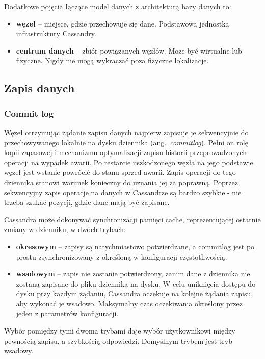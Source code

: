 Dodatkowe pojęcia łączące model danych z architekturą bazy danych to:
\begin{itemize}
    \item \textbf{węzeł} -- miejsce, gdzie przechowuje się dane.
    Podstawowa jednostka infrastruktury Cassandry.
    \item \textbf{centrum danych} -- zbiór powiązanych węzłów. 
    Może być wirtualne lub fizyczne.
    Nigdy nie mogą wykraczać poza fizyczne lokalizacje.
\end{itemize}

\subsection{Zapis danych}

\subsubsection{Commit log}

Węzeł otrzymując żądanie zapisu danych najpierw zapisuje je sekwencyjnie do przechowywanego lokalnie na dysku dziennika (ang.~\textit{commitlog}).
Pełni on rolę kopii zapasowej i mechanizmu optymalizacji zapisu historii przeprowadzonych operacji na wypadek awarii.
Po restarcie uszkodzonego węzła na jego podstawie węzeł jest wstanie powrócić do stanu sprzed awarii.
Zapis operacji do tego dziennika stanowi warunek konieczny do uznania jej za poprawną.
Poprzez sekwencyjny zapis operacje na danych w Cassandrze są bardzo szybkie - nie trzeba szukać pozycji, gdzie dane mają być zapisane.

Cassandra może dokonywać synchronizacji pamięci cache, reprezentującej ostatnie zmiany w dzienniku, w dwóch trybach:
\begin{itemize}
    \item \textbf{okresowym} -- zapisy są natychmiastowo potwierdzane, a commitlog jest po prostu zsynchronizowany z określoną w konfiguracji częstotliwością.
    \item \textbf{wsadowym} -- zapis nie zostanie potwierdzony, zanim dane z dziennika nie zostaną zapisane do pliku dziennika na dysku. 
    W celu uniknięcia dostępu do dysku przy każdym żądaniu, Cassandra oczekuje na kolejne żądania zapisu, aby wykonać je wsadowo. 
    Maksymalny czas oczekiwania określony przez jeden z parametrów konfiguracji.
\end{itemize}
Wybór pomiędzy tymi dwoma trybami daje wybór użytkownikowi między pewnością zapisu, a szybkością odpowiedzi. Domyślnym trybem jest tryb wsadowy.

